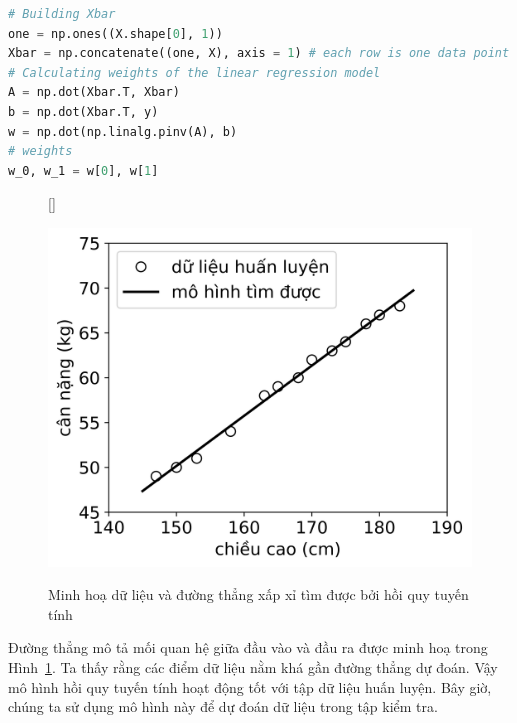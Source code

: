 


\begin{lstlisting}[language=Python]
# Building Xbar
one = np.ones((X.shape[0], 1))
Xbar = np.concatenate((one, X), axis = 1) # each row is one data point
# Calculating weights of the linear regression model
A = np.dot(Xbar.T, Xbar)
b = np.dot(Xbar.T, y)
w = np.dot(np.linalg.pinv(A), b)
# weights
w_0, w_1 = w[0], w[1]
\end{lstlisting}




\begin{figure}[t]
[\FBwidth]
{\caption{
Minh hoạ dữ liệu và đường thẳng xấp xỉ tìm được bởi hồi quy tuyến tính
}
\label{fig:3_2}}
{ %
\includegraphics[width=.5\textwidth]{Chapters/03_SimpleML/3_linearregression/lr_ex.png}
}
\end{figure}
Đường thẳng mô tả mối quan hệ giữa đầu vào và đầu ra được minh hoạ trong
Hình~\ref{fig:3_2}. Ta thấy rằng các điểm dữ liệu nằm khá gần đường thẳng dự
đoán. Vậy mô hình hồi quy tuyến tính hoạt động tốt với tập dữ liệu huấn luyện.
Bây giờ, chúng ta sử dụng mô hình này để dự đoán dữ liệu trong tập kiểm tra.

